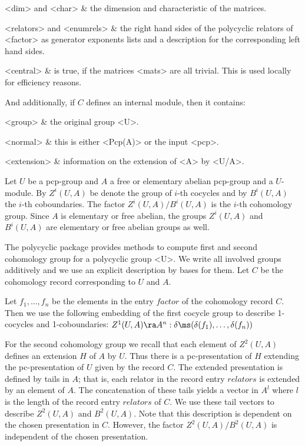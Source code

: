 <dim> and <char> &
      the dimension and characteristic of the matrices.

<relators> and <enumrels> &
      the right hand sides of the polycyclic relators of <factor> as 
      generator exponents lists and a description for the corresponding 
      left hand sides.

<central> &
      is true, if the matrices <mats> are all trivial. This is used
      locally for efficiency reasons.
\enditems

And additionally, if $C$ defines an internal module, then it contains:

\beginitems
<group> & 
      the original group <U>.

<normal> &
      this is either <Pcp(A)> or the input <pcp>. 

<extension> &
      information on the extension of <A> by <U/A>.

\enditems


Let $U$ be a pcp-group and $A$ a free or elementary abelian pcp-group
and a $U$-module. By $Z^i(U, A)$ be denote the group of $i$-th cocycles
and by $B^i(U, A)$ the $i$-th coboundaries. The factor $Z^i(U,A) / B^i(U,A)$
is the $i$-th cohomology group. Since $A$ is elementary or free abelian,
the groups $Z^i(U, A)$ and $B^i(U, A)$ are elementary or free abelian 
groups as well. 

The {\sf polycyclic} package provides methods to compute first and
second cohomology group for a polycyclic group <U>.  We write all
involved groups additively and we use an explicit description by bases
for them.  Let $C$ be the cohomology record corresponding to $U$ and
$A$.

Let $f_1, \ldots, f_n$ be the elements in the entry $factor$ of the 
cohomology record $C$. Then we use the following embedding of the 
first cocycle group to describe 1-cocycles and 1-coboundaries:
$Z^1(U, A) \ra A^n : \delta \ms (\delta(f_1), \ldots, \delta(f_n))$ 

For the second cohomology group we recall that each element of $Z^2(U, A)$ 
defines an extension $H$ of $A$ by $U$. Thus there is a pc-presentation 
of $H$ extending the pc-presentation of $U$ given by the record $C$. 
The extended presentation is defined by tails in $A$; that is, each 
relator in the record entry $relators$ is extended by an element of $A$. 
The concatenation of these tails yields a vector in $A^l$ where $l$ is
the length of the record entry $relators$ of $C$. We use these tail 
vectors to describe $Z^2(U, A)$ and $B^2(U, A)$. Note that this 
description is dependent on the chosen presentation in $C$. However, 
the factor $Z^2(U, A)/ B^2(U, A)$ is independent of the chosen presentation.
 
